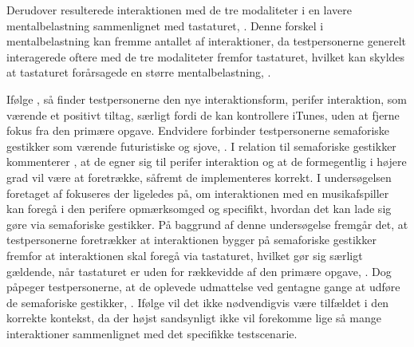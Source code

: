 Derudover resulterede interaktionen med de tre modaliteter i en lavere mentalbelastning sammenlignet med tastaturet, \parencite[s. 172]{PDF:ComparingInputModalities}. Denne forskel i mentalbelastning kan fremme antallet af interaktioner, da testpersonerne generelt interagerede oftere med de tre modaliteter fremfor tastaturet, hvilket kan skyldes at tastaturet forårsagede en større mentalbelastning, \parencite[ss. 174-175]{PDF:ComparingInputModalities}.    

Ifølge \textcite[ss. 173-174]{PDF:ComparingInputModalities}, så finder testpersonerne den nye interaktionsform, perifer interaktion, som værende et positivt tiltag, særligt fordi de kan kontrollere iTunes, uden at fjerne fokus fra den primære opgave. Endvidere forbinder testpersonerne semaforiske gestikker som værende futuristiske og sjove, \parencite[s. 174]{PDF:ComparingInputModalities}. I relation til semaforiske gestikker kommenterer \textcite[s. 177]{PDF:ComparingInputModalities}, at de egner sig til perifer interaktion og at de formegentlig i højere grad vil være at foretrække, såfremt de implementeres korrekt.\blankline
%                    
I undersøgelsen foretaget af \textcite{PDF:AStudyOnTheUseOfSemaphoricGestures} fokuseres der ligeledes på, om interaktionen med en musikafspiller kan foregå i den perifere opmærksomged og specifikt, hvordan det kan lade sig gøre via semaforiske gestikker. På baggrund af denne undersøgelse fremgår det, at testpersonerne foretrækker at interaktionen bygger på semaforiske gestikker fremfor at interaktionen skal foregå via tastaturet, hvilket gør sig særligt gældende, når tastaturet er uden for rækkevidde af den primære opgave, \parencite[s. 1963]{PDF:AStudyOnTheUseOfSemaphoricGestures}. Dog påpeger testpersonerne, at de oplevede udmattelse ved gentagne gange at udføre de semaforiske gestikker, \parencite[s. 1963]{PDF:AStudyOnTheUseOfSemaphoricGestures}. Ifølge \textcite[s. 1963]{PDF:AStudyOnTheUseOfSemaphoricGestures} vil det ikke nødvendigvis være tilfældet i den korrekte kontekst, da der højst sandsynligt ikke vil forekomme lige så mange interaktioner sammenlignet med det specifikke testscenarie. 

